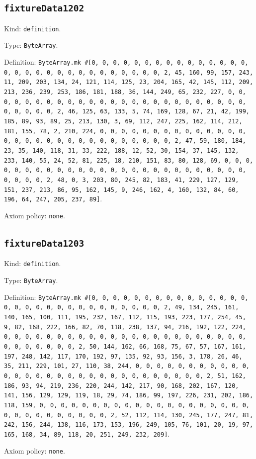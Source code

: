 \documentclass[11pt]{article}
\begin{document}
\subsection*{\texttt{fixtureData1202}}
\noindent Kind: \texttt{definition}.\par
\noindent Type: \texttt{ByteArray}.\par
\noindent Definition: \texttt{ByteArray.mk \#[0, 0, 0, 0, 0, 0, 0, 0, 0, 0, 0, 0, 0, 0, 0, 0, 0, 0, 0, 0, 0, 0, 0, 0, 0, 0, 0, 0, 0, 0, 2, 45, 160, 99, 157, 243, 11, 209, 203, 134, 24, 121, 114, 125, 23, 204, 165, 42, 145, 112, 209, 213, 236, 239, 253, 186, 181, 188, 36, 144, 249, 65, 232, 227, 0, 0, 0, 0, 0, 0, 0, 0, 0, 0, 0, 0, 0, 0, 0, 0, 0, 0, 0, 0, 0, 0, 0, 0, 0, 0, 0, 0, 0, 0, 2, 46, 125, 63, 133, 5, 74, 169, 128, 67, 21, 42, 199, 185, 89, 93, 89, 25, 213, 130, 3, 69, 112, 247, 225, 162, 114, 212, 181, 155, 78, 2, 210, 224, 0, 0, 0, 0, 0, 0, 0, 0, 0, 0, 0, 0, 0, 0, 0, 0, 0, 0, 0, 0, 0, 0, 0, 0, 0, 0, 0, 0, 0, 0, 2, 47, 59, 180, 184, 23, 35, 140, 118, 31, 33, 222, 188, 12, 52, 30, 154, 37, 145, 132, 233, 140, 55, 24, 52, 81, 225, 18, 210, 151, 83, 80, 128, 69, 0, 0, 0, 0, 0, 0, 0, 0, 0, 0, 0, 0, 0, 0, 0, 0, 0, 0, 0, 0, 0, 0, 0, 0, 0, 0, 0, 0, 0, 0, 2, 48, 0, 3, 203, 80, 245, 82, 183, 41, 229, 127, 129, 151, 237, 213, 86, 95, 162, 145, 9, 246, 162, 4, 160, 132, 84, 60, 196, 64, 247, 205, 237, 89]}.\par
\noindent Axiom policy: \texttt{none}.\par
\subsection*{\texttt{fixtureData1203}}
\noindent Kind: \texttt{definition}.\par
\noindent Type: \texttt{ByteArray}.\par
\noindent Definition: \texttt{ByteArray.mk \#[0, 0, 0, 0, 0, 0, 0, 0, 0, 0, 0, 0, 0, 0, 0, 0, 0, 0, 0, 0, 0, 0, 0, 0, 0, 0, 0, 0, 0, 0, 2, 49, 134, 245, 161, 140, 165, 100, 111, 195, 232, 167, 112, 115, 193, 223, 177, 254, 45, 9, 82, 168, 222, 166, 82, 70, 118, 238, 137, 94, 216, 192, 122, 224, 0, 0, 0, 0, 0, 0, 0, 0, 0, 0, 0, 0, 0, 0, 0, 0, 0, 0, 0, 0, 0, 0, 0, 0, 0, 0, 0, 0, 0, 0, 2, 50, 144, 162, 66, 168, 75, 67, 57, 167, 161, 197, 248, 142, 117, 170, 192, 97, 135, 92, 93, 156, 3, 178, 26, 46, 35, 211, 229, 101, 27, 110, 38, 244, 0, 0, 0, 0, 0, 0, 0, 0, 0, 0, 0, 0, 0, 0, 0, 0, 0, 0, 0, 0, 0, 0, 0, 0, 0, 0, 0, 0, 0, 0, 2, 51, 162, 186, 93, 94, 219, 236, 220, 244, 142, 217, 90, 168, 202, 167, 120, 141, 156, 129, 129, 119, 18, 29, 74, 186, 99, 197, 226, 231, 202, 186, 118, 159, 0, 0, 0, 0, 0, 0, 0, 0, 0, 0, 0, 0, 0, 0, 0, 0, 0, 0, 0, 0, 0, 0, 0, 0, 0, 0, 0, 0, 0, 0, 2, 52, 112, 114, 130, 245, 177, 247, 81, 242, 156, 244, 138, 116, 173, 153, 196, 249, 105, 76, 101, 20, 19, 97, 165, 168, 34, 89, 118, 20, 251, 249, 232, 209]}.\par
\noindent Axiom policy: \texttt{none}.\par
\end{document}
